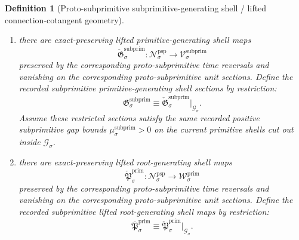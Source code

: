 \documentclass[11pt]{article}
\newcommand{\PrimTarget}[1]{\mathcal W_{#1}^{\mathrm{prim}}}
\newcommand{\SubprimTarget}[1]{\mathcal V_{#1}^{\mathrm{subprim}}}
\newcommand{\SubprimGap}[1]{\mu_{#1}^{\mathrm{subprim}}}
\newcommand{\ProtoSubprimTargetMetric}[1]{t_{#1}^{\mathrm{psp}}}
\newcommand{\ProtoSubprimGap}[1]{\nu_{#1}^{\mathrm{psp}}}
\newcommand{\SubprimSpace}[1]{\mathcal G_{#1}}
\newcommand{\SubprimSection}[1]{\mathfrak G_{#1}^{\mathrm{subprim}}}
\newcommand{\SubprimInc}[1]{\iota_{#1}^{\mathrm{subprim}}}
\newcommand{\SubprimLiftedRoot}[1]{\overline{\mathfrak P}_{#1}^{\mathrm{prim}}}
\newcommand{\ProtoSubprimSpace}[1]{\mathcal N_{#1}^{\mathrm{psp}}}
\newcommand{\ProtoSubprimMetric}[1]{N_{#1}^{\mathrm{psp}}}
\newcommand{\ProtoSubprimSection}[1]{\mathfrak T_{#1}^{\mathrm{psp}}}
\newcommand{\ProtoSubprimLiftedPrimitive}[1]{\check{\mathfrak G}_{#1}^{\mathrm{subprim}}}
\newcommand{\ProtoSubprimLiftedRoot}[1]{\check{\mathfrak P}_{#1}^{\mathrm{prim}}}
\newtheorem{definition}{Definition}
\begin{document}
\begin{definition}[Proto-subprimitive subprimitive-generating shell / lifted connection-cotangent geometry]
\begin{enumerate}
    Let
    \begin{equation}
    \SubprimInc{\sigma}:\SubprimSpace{\sigma}\hookrightarrow \ProtoSubprimSpace{\sigma}
    \label{eq:subprimitive_inclusion}
    \end{equation}
    be the shell inclusion. Assume this shell is a closed embedded \(C^2\) submanifold, invariant under the corresponding proto-subprimitive time reversal, and containing the image of the corresponding proto-subprimitive unit section. Assume further that, for every \(x\in\SubprimSpace{\sigma}\),
    \begin{equation}
    \ProtoSubprimTargetMetric{\sigma}\!\left(
    D\ProtoSubprimSection{\sigma}(x)\xi,
    D\ProtoSubprimSection{\sigma}(x)\xi
    \right)
    \ge
    \ProtoSubprimGap{\sigma}\,
    \ProtoSubprimMetric{\sigma}(\xi,\xi),
    \qquad
    \ProtoSubprimGap{\sigma}>0,
    \label{eq:protosubprimitive_gap}
    \end{equation}
    for all \(\xi\) orthogonal, with respect to \(\ProtoSubprimMetric{\sigma}\), to \(T_x\SubprimSpace{\sigma}\).
    \item there are exact-preserving lifted primitive-generating shell maps
    \[
    \ProtoSubprimLiftedPrimitive{\sigma}:\ProtoSubprimSpace{\sigma}\to\SubprimTarget{\sigma}
    \]
    preserved by the corresponding proto-subprimitive time reversals and vanishing on the corresponding proto-subprimitive unit sections. Define the recorded subprimitive primitive-generating shell sections by restriction:
    \begin{equation}
    \SubprimSection{\sigma}\equiv \ProtoSubprimLiftedPrimitive{\sigma}|_{\SubprimSpace{\sigma}}.
    \label{eq:subprimitive_section_from_protosubprimitive}
    \end{equation}
    Assume these restricted sections satisfy the same recorded positive subprimitive gap bounds \(\SubprimGap{\sigma}>0\) on the current primitive shells cut out inside \(\SubprimSpace{\sigma}\).
    \item there are exact-preserving lifted root-generating shell maps
    \[
    \ProtoSubprimLiftedRoot{\sigma}:\ProtoSubprimSpace{\sigma}\to\PrimTarget{\sigma}
    \]
    preserved by the corresponding proto-subprimitive time reversals and vanishing on the corresponding proto-subprimitive unit sections. Define the recorded subprimitive lifted root-generating shell maps by restriction:
    \begin{equation}
    \SubprimLiftedRoot{\sigma}\equiv \ProtoSubprimLiftedRoot{\sigma}|_{\SubprimSpace{\sigma}}.
    \label{eq:subprimitive_root_from_protosubprimitive}

\end{equation}
\end{enumerate}
\end{definition}
\end{document}
